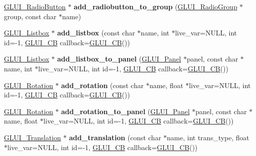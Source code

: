 \begin{DoxyCompactItemize}
\item 
\hypertarget{classGLUI_ab51b55ac34959b9ebbf96d0275762d61}{\hyperlink{classGLUI__RadioButton}{G\-L\-U\-I\-\_\-\-Radio\-Button} $\ast$ {\bfseries add\-\_\-radiobutton\-\_\-to\-\_\-group} (\hyperlink{classGLUI__RadioGroup}{G\-L\-U\-I\-\_\-\-Radio\-Group} $\ast$group, const char $\ast$name)}\label{classGLUI_ab51b55ac34959b9ebbf96d0275762d61}

\item 
\hypertarget{classGLUI_af53d02f127222cda08ffb816f82825f0}{\hyperlink{classGLUI__Listbox}{G\-L\-U\-I\-\_\-\-Listbox} $\ast$ {\bfseries add\-\_\-listbox} (const char $\ast$name, int $\ast$live\-\_\-var=N\-U\-L\-L, int id=-\/1, \hyperlink{classGLUI__CB}{G\-L\-U\-I\-\_\-\-C\-B} callback=\hyperlink{classGLUI__CB}{G\-L\-U\-I\-\_\-\-C\-B}())}\label{classGLUI_af53d02f127222cda08ffb816f82825f0}

\item 
\hypertarget{classGLUI_a46841a8ac40bb010858366b3d8ba4e86}{\hyperlink{classGLUI__Listbox}{G\-L\-U\-I\-\_\-\-Listbox} $\ast$ {\bfseries add\-\_\-listbox\-\_\-to\-\_\-panel} (\hyperlink{classGLUI__Panel}{G\-L\-U\-I\-\_\-\-Panel} $\ast$panel, const char $\ast$name, int $\ast$live\-\_\-var=N\-U\-L\-L, int id=-\/1, \hyperlink{classGLUI__CB}{G\-L\-U\-I\-\_\-\-C\-B} callback=\hyperlink{classGLUI__CB}{G\-L\-U\-I\-\_\-\-C\-B}())}\label{classGLUI_a46841a8ac40bb010858366b3d8ba4e86}

\item 
\hypertarget{classGLUI_a655410f5989334cd550e2c1612c324a7}{\hyperlink{classGLUI__Rotation}{G\-L\-U\-I\-\_\-\-Rotation} $\ast$ {\bfseries add\-\_\-rotation} (const char $\ast$name, float $\ast$live\-\_\-var=N\-U\-L\-L, int id=-\/1, \hyperlink{classGLUI__CB}{G\-L\-U\-I\-\_\-\-C\-B} callback=\hyperlink{classGLUI__CB}{G\-L\-U\-I\-\_\-\-C\-B}())}\label{classGLUI_a655410f5989334cd550e2c1612c324a7}

\item 
\hypertarget{classGLUI_a384601abb0c898da96434cb068b7335f}{\hyperlink{classGLUI__Rotation}{G\-L\-U\-I\-\_\-\-Rotation} $\ast$ {\bfseries add\-\_\-rotation\-\_\-to\-\_\-panel} (\hyperlink{classGLUI__Panel}{G\-L\-U\-I\-\_\-\-Panel} $\ast$panel, const char $\ast$name, float $\ast$live\-\_\-var=N\-U\-L\-L, int id=-\/1, \hyperlink{classGLUI__CB}{G\-L\-U\-I\-\_\-\-C\-B} callback=\hyperlink{classGLUI__CB}{G\-L\-U\-I\-\_\-\-C\-B}())}\label{classGLUI_a384601abb0c898da96434cb068b7335f}

\item 
\hypertarget{classGLUI_a65a89c82b1ac612af6c4b96d00e91052}{\hyperlink{classGLUI__Translation}{G\-L\-U\-I\-\_\-\-Translation} $\ast$ {\bfseries add\-\_\-translation} (const char $\ast$name, int trans\-\_\-type, float $\ast$live\-\_\-var=N\-U\-L\-L, int id=-\/1, \hyperlink{classGLUI__CB}{G\-L\-U\-I\-\_\-\-C\-B} callback=\hyperlink{classGLUI__CB}{G\-L\-U\-I\-\_\-\-C\-B}())}\label{classGLUI_a65a89c82b1ac612af6c4b96d00e91052}


\end{DoxyCompactItemize}
